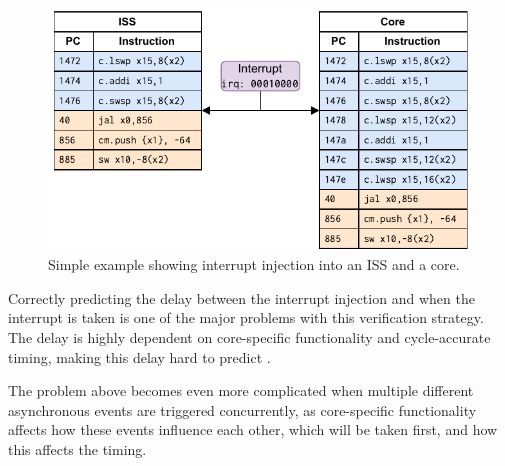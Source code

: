 \begin{figure}
    \centering
    \includegraphics[width=0.75\linewidth]{figures/lw_add_sw_example.pdf}
    \caption{Simple example showing interrupt injection into an ISS and a core.}
    \label{fig:lw_example}
\end{figure}

Correctly predicting the delay between the interrupt injection and when the interrupt is taken is one of the major problems with this verification strategy. The delay is highly dependent on core-specific functionality and cycle-accurate timing, making this delay hard to predict \cite{taylorAdvancedRISCVVerification2023}. 

The problem above becomes even more complicated when multiple different asynchronous events are triggered concurrently, as core-specific functionality affects how these events influence each other, which will be taken first, and how this affects the timing. 






%



%
%


%    

